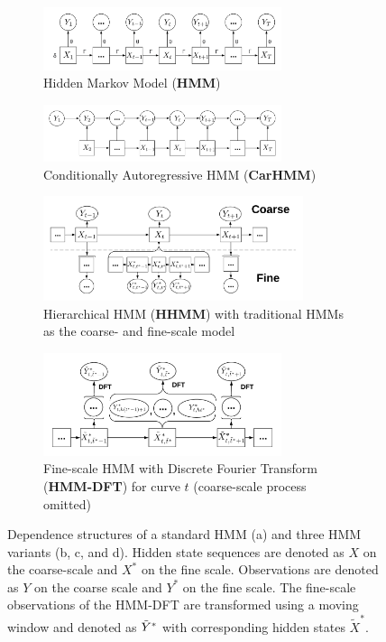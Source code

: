 
\begin{figure}[ht]
    \begin{subfigure}{\textwidth}
      \centering
      \includegraphics[width=2.75in]{../Plots/HMM.png}  
      \caption{Hidden Markov Model (\textbf{HMM})}
      \label{fig:HMM}
    \end{subfigure}
    \newline
    \begin{subfigure}{\textwidth}
      \centering
      \includegraphics[width=2.75in]{../Plots/CarHMM.png}  
      \caption{Conditionally Autoregressive HMM (\textbf{CarHMM})}
      \label{fig:CarHMM}
    \end{subfigure}
    \newline
    \begin{subfigure}{\textwidth}
      \centering
      \includegraphics[width=3in]{../Plots/HHMM.png}  
      \caption{Hierarchical HMM (\textbf{HHMM}) with traditional HMMs as the coarse- and fine-scale model}
      \label{fig:HHMM}
    \end{subfigure}
    \newline
    \begin{subfigure}{\textwidth}
      \centering
      \includegraphics[width=2.75in]{../Plots/HMM-DFT.png}  
      \caption{Fine-scale HMM with Discrete Fourier Transform (\textbf{HMM-DFT}) for curve $t$ (coarse-scale process omitted)}
      \label{fig:HMM-DFT}
    \end{subfigure}
    \caption{Dependence structures of a standard HMM (a) and three HMM variants (b, c, and d). Hidden state sequences are denoted as $X$ on the coarse-scale and $X^*$ on the fine scale. Observations are denoted as $Y$ on the coarse scale and $Y^*$ on the fine scale. The fine-scale observations of the HMM-DFT are transformed using a moving window and denoted as $\tilde{Y}^*$ with corresponding hidden states $\tilde X^*$.}
    \label{fig:models}
\end{figure}

